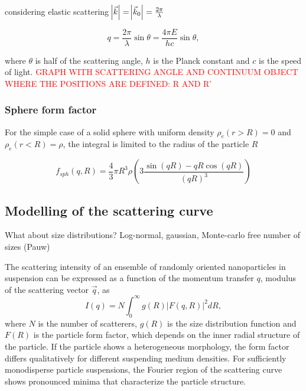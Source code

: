considering elastic scattering $\abs{\vec{k}}=\abs{\vec{k}_0}=\frac{2\pi}{\lambda}$

\begin{equation}
q=\frac{2\pi }{\lambda}\sin\theta=\frac{4\pi E}{h c}\sin\theta ,
\end{equation}

where \(\theta\) is half of the scattering angle, \(h\) is the Planck constant and \(c\) is the speed of light. \textcolor{red}{GRAPH WITH SCATTERING ANGLE AND CONTINUUM OBJECT WHERE THE POSITIONS ARE DEFINED: R AND R'}
\subsubsection{Sphere form factor}
For the simple case of a solid sphere with uniform density $\rho_e(r>R)=0$ and $\rho_e(r<R)=\rho$, the integral is limited to the radius of the particle $R$

\begin{equation}
       f_{sph}(q,R)=\frac{4}{3}\pi R^3 \rho \left( 3\frac{\sin(qR)-qR\cos(qR)}{\left( qR \right)^3} \right)
\end{equation}

\subsection{Modelling of the scattering curve}
What about size distributions? Log-normal, gaussian, Monte-carlo free number of sizes (Pauw)

The scattering intensity of an ensemble of randomly oriented nanoparticles in suspension can be expressed as a function of the momentum transfer \( q \), modulus of the scattering vector \(\vec q\), as
\begin{equation}
\label{eq:intensity}
I(q)=N\int_{0}^{\infty} g(R)\left|F(q,R) \right|^2 dR,
\end{equation}
where \(N\) is the number of scatterers, \(g(R)\) is the size distribution function and \(F(R)\) is the particle form factor, which depends on the inner radial structure of the particle. If the particle shows a heterogeneous morphology, the form factor differs qualitatively for different suspending medium densities.  For sufficiently monodisperse particle suspensions, the Fourier region of the scattering curve shows pronounced minima that characterize the particle structure. 

